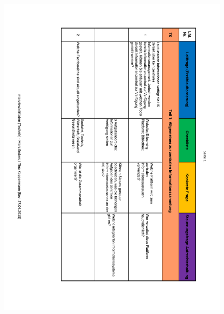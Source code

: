 \begin{figure}
	\centering
	\includegraphics[width=18cm]{kapitel/anhang/Interviewleitfaden_1}
\end{figure}

